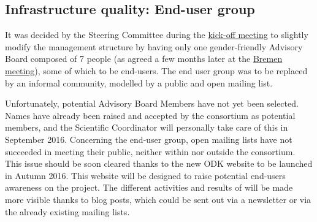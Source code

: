 \documentclass{deliverablereport}
\begin{document}
\subsection{Infrastructure quality: End-user group}


It was decided by the Steering Committee during the
\href{http://opendreamkit.org/meetings/2015-09-02-Kickoff/management_structure/}{kick-off meeting}
to slightly modify the management structure by having only one
gender-friendly Advisory Board composed of 7 people (as agreed a few
months later at the
\href{http://opendreamkit.org/meetings/2016-06-27-Bremen/minutes/}{Bremen meeting}),
some of which to be end-users.  The end user group was to be replaced
by an informal community, modelled by a public and open mailing list.

Unfortunately, potential Advisory Board Members have not yet been selected. Names have already been raised and
accepted by the consortium as potential members, and the Scientific Coordinator will personally take care of this in September 2016. Concerning the end-user group,
open mailing lists have not succeeded in meeting their public, neither within \ODK nor outside the consortium.
This issue should be soon cleared thanks to the new ODK website to be launched in Autumn 2016. This website will be designed to
raise potential end-users awareness on the project. The different activities and results of \ODK will be made more visible thanks to blog posts, which could be sent out
via a newsletter or via the already existing mailing lists.



\printbibliography
\end{document}
